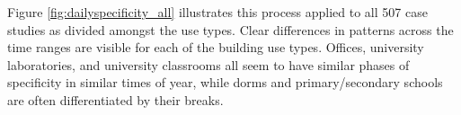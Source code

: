 Figure \ref{fig:dailyspecificity_all} illustrates this process applied to all 507 case studies as divided amongst the use types. Clear differences in patterns across the time ranges are visible for each of the building use types. Offices, university laboratories, and university classrooms all seem to have similar phases of specificity in similar times of year, while dorms and primary/secondary schools are often differentiated by their breaks.
